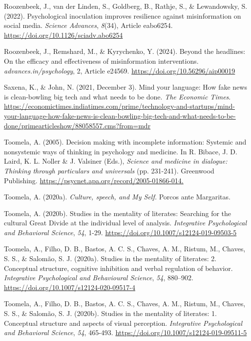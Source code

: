 \documentclass[authordate, reflection, issue]{jote-new-article}
\begin{document}
	Roozenbeek, J., van der Linden, S., Goldberg, B., Rathje, S., \& Lewandowsky, S. (2022). Psychological inoculation improves resilience against misinformation on social media. \emph{Science Advances}, \emph{8}(34), Article eabo6254. \url{https://doi.org/10.1126/sciadv.abo6254}



	Roozenbeek, J., Remshard, M., \& Kyrychenko, Y. (2024). Beyond the headlines: On the efficacy and effectiveness of misinformation interventions. \emph{advances.in/psychology}, 2, Article e24569. \url{https://doi.org/10.56296/aip00019}



	Saxena, K., \& John, N. (2021, December 3). Mind your language: How fake news is clean-bowling big tech and what needs to be done. \emph{The Economic Times}. \url{https://economictimes.indiatimes.com/prime/technology-and-startups/mind-your-language-how-fake-news-is-clean-bowling-big-tech-and-what-needs-to-be-done/primearticleshow/88058557.cms?from=mdr}



	Toomela, A. (2005). Decision making with incomplete information: Systemic and nonsystemic ways of thinking in psychology and medicine. In R. Bibace, J. D. Laird, K. L. Noller \& J. Valsiner (Eds.), \emph{Science and medicine in dialogue: Thinking through particulars and universals} (pp. 231-241). Greenwood Publishing. \url{https://psycnet.apa.org/record/2005-01866-014.}



	Toomela, A. (2020a). \emph{Culture, speech, and My Self. }Porcos ante Margaritas.



	Toomela, A. (2020b). Studies in the mentality of literates: Searching for the cultural Great Divide at the individual level of analysis. \emph{Integrative Psychological and Behavioral Science}, \emph{54}, 1-29. \url{https://doi.org/10.1007/s12124-019-09503-5}



	Toomela, A., Filho, D. B., Bastos, A. C. S., Chaves, A. M., Ristum, M., Chaves, S. S., \& Salomão, S. J. (2020a). Studies in the mentality of literates: 2. Conceptual structure, cognitive inhibition and verbal regulation of behavior. \emph{Integrative Psychological and Behavioural Science}, \emph{54}, 880--902. \url{https://doi.org/10.1007/s12124-020-09517-4}



	Toomela, A., Filho, D. B., Bastos, A. C. S., Chaves, A. M., Ristum, M., Chaves, S. S., \& Salomão, S. J. (2020b). Studies in the mentality of literates: 1. Conceptual structure and aspects of visual perception. \emph{Integrative Psychological and Behavioral Science}, \emph{54}, 465-493. \url{https://doi.org/10.1007/s12124-019-09511-5}
\end{document}
